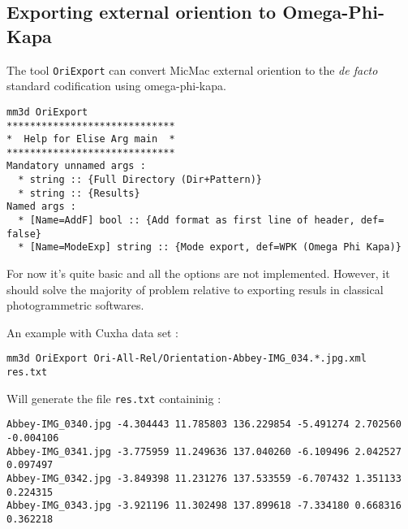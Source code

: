 \subsection{Exporting external oriention to Omega-Phi-Kapa}

The tool {\tt OriExport} can convert MicMac external oriention to the \emph{de facto} standard
codification using omega-phi-kapa.


\begin{verbatim}
mm3d OriExport
*****************************
*  Help for Elise Arg main  *
*****************************
Mandatory unnamed args :
  * string :: {Full Directory (Dir+Pattern)}
  * string :: {Results}
Named args :
  * [Name=AddF] bool :: {Add format as first line of header, def= false}
  * [Name=ModeExp] string :: {Mode export, def=WPK (Omega Phi Kapa)}
\end{verbatim}

For now it's quite basic and all the options are not implemented. However, it should solve the
majority of problem relative to exporting resuls in classical photogrammetric softwares.

An example with Cuxha data set :

\begin{verbatim}
mm3d OriExport Ori-All-Rel/Orientation-Abbey-IMG_034.*.jpg.xml  res.txt
\end{verbatim}

Will generate the file {\tt res.txt}  containinig :

\begin{verbatim}
Abbey-IMG_0340.jpg -4.304443 11.785803 136.229854 -5.491274 2.702560 -0.004106
Abbey-IMG_0341.jpg -3.775959 11.249636 137.040260 -6.109496 2.042527 0.097497
Abbey-IMG_0342.jpg -3.849398 11.231276 137.533559 -6.707432 1.351133 0.224315
Abbey-IMG_0343.jpg -3.921196 11.302498 137.899618 -7.334180 0.668316 0.362218
\end{verbatim}











